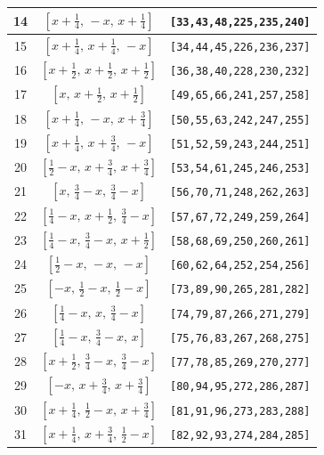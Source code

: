 \documentclass[fleqn,8pt]{jsarticle}
\begin{document}
\begin{longtable}{ccc}
14 & $\left[ x + \frac{1}{4},\, - x,\, x + \frac{1}{4} \right]$ & {\tt [33,43,48,225,235,240]} \\ \hline
15 & $\left[ x + \frac{1}{4},\, x + \frac{1}{4},\, - x \right]$ & {\tt [34,44,45,226,236,237]} \\ \hline
16 & $\left[ x + \frac{1}{2},\, x + \frac{1}{2},\, x + \frac{1}{2} \right]$ & {\tt [36,38,40,228,230,232]} \\ \hline
17 & $\left[ x,\, x + \frac{1}{2},\, x + \frac{1}{2} \right]$ & {\tt [49,65,66,241,257,258]} \\ \hline
18 & $\left[ x + \frac{1}{4},\, - x,\, x + \frac{3}{4} \right]$ & {\tt [50,55,63,242,247,255]} \\ \hline
19 & $\left[ x + \frac{1}{4},\, x + \frac{3}{4},\, - x \right]$ & {\tt [51,52,59,243,244,251]} \\ \hline
20 & $\left[ \frac{1}{2} - x,\, x + \frac{3}{4},\, x + \frac{3}{4} \right]$ & {\tt [53,54,61,245,246,253]} \\ \hline
21 & $\left[ x,\, \frac{3}{4} - x,\, \frac{3}{4} - x \right]$ & {\tt [56,70,71,248,262,263]} \\ \hline
22 & $\left[ \frac{1}{4} - x,\, x + \frac{1}{2},\, \frac{3}{4} - x \right]$ & {\tt [57,67,72,249,259,264]} \\ \hline
23 & $\left[ \frac{1}{4} - x,\, \frac{3}{4} - x,\, x + \frac{1}{2} \right]$ & {\tt [58,68,69,250,260,261]} \\ \hline
24 & $\left[ \frac{1}{2} - x,\, - x,\, - x \right]$ & {\tt [60,62,64,252,254,256]} \\ \hline
25 & $\left[ - x,\, \frac{1}{2} - x,\, \frac{1}{2} - x \right]$ & {\tt [73,89,90,265,281,282]} \\ \hline
26 & $\left[ \frac{1}{4} - x,\, x,\, \frac{3}{4} - x \right]$ & {\tt [74,79,87,266,271,279]} \\ \hline
27 & $\left[ \frac{1}{4} - x,\, \frac{3}{4} - x,\, x \right]$ & {\tt [75,76,83,267,268,275]} \\ \hline
28 & $\left[ x + \frac{1}{2},\, \frac{3}{4} - x,\, \frac{3}{4} - x \right]$ & {\tt [77,78,85,269,270,277]} \\ \hline
29 & $\left[ - x,\, x + \frac{3}{4},\, x + \frac{3}{4} \right]$ & {\tt [80,94,95,272,286,287]} \\ \hline
30 & $\left[ x + \frac{1}{4},\, \frac{1}{2} - x,\, x + \frac{3}{4} \right]$ & {\tt [81,91,96,273,283,288]} \\ \hline
31 & $\left[ x + \frac{1}{4},\, x + \frac{3}{4},\, \frac{1}{2} - x \right]$ & {\tt [82,92,93,274,284,285]} \\ \hline

\end{longtable}
\end{document}
